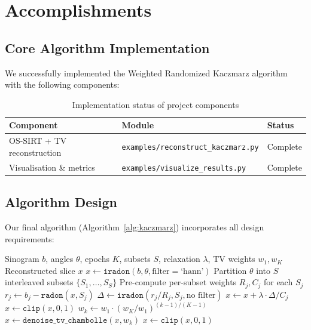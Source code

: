 \documentclass[11pt,a4paper]{article}
\begin{document}
\section{Accomplishments}

\subsection{Core Algorithm Implementation}

We successfully implemented the Weighted Randomized Kaczmarz algorithm with the following components:

\begin{table}[h]
\centering
\begin{tabular}{lll}
\toprule
\textbf{Component} & \textbf{Module} & \textbf{Status} \\
\midrule
OS-SIRT + TV reconstruction & \texttt{examples/reconstruct\_kaczmarz.py} & Complete \\
Visualisation \& metrics & \texttt{examples/visualize\_results.py} & Complete \\
\bottomrule
\end{tabular}
\caption{Implementation status of project components}
\end{table}

\subsection{Algorithm Design}

Our final algorithm (Algorithm~\ref{alg:kaczmarz}) incorporates all design requirements:

\begin{algorithm}[h]
\caption{TV-Regularised Ordered-Subsets SIRT (OS-SIRT) Reconstruction}
\label{alg:kaczmarz}
\begin{algorithmic}[1]
\Require Sinogram $b$, angles $\theta$, epochs $K$, subsets $S$, relaxation $\lambda$, TV weights $w_1, w_K$
\Ensure Reconstructed slice $x$
\State $x \gets \texttt{iradon}(b, \theta, \text{filter}=\text{`hann'})$ 
\State Partition $\theta$ into $S$ interleaved subsets $\{S_1, \ldots, S_S\}$
\State Pre-compute per-subset weights $R_j, C_j$ for each $S_j$
 
     
        \State $r_j \gets b_j - \texttt{radon}(x, S_j)$ 
        \State $\Delta \gets \texttt{iradon}(r_j / R_j, S_j, \text{no filter})$ 
        \State $x \gets x + \lambda \cdot \Delta / C_j$ 
        \State $x \gets \texttt{clip}(x, 0, 1)$ 
    \EndFor
    \State $w_k \gets w_1 \cdot (w_K / w_1)^{(k-1)/(K-1)}$ 
    \State $x \gets \texttt{denoise\_tv\_chambolle}(x, w_k)$ 
    \State $x \gets \texttt{clip}(x, 0, 1)$
\EndFor
\end{algorithmic}
\end{algorithm}
\end{document}
